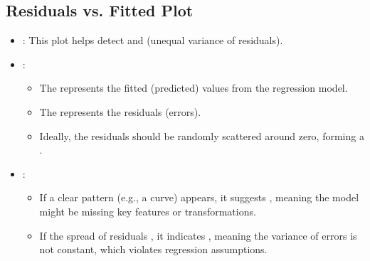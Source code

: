 \documentclass[letterpaper,10pt,english]{jupyterBook}
\begin{document}
\subsection{Residuals vs. Fitted Plot}
\label{\detokenize{02:residuals-vs-fitted-plot}}\begin{itemize}
\item {} 
\sphinxAtStartPar
{}: This plot helps detect  and  (unequal variance of residuals).

\item {} 
\sphinxAtStartPar
{}:
\begin{itemize}
\item {} 
\sphinxAtStartPar
The  represents the fitted (predicted) values from the regression model.

\item {} 
\sphinxAtStartPar
The  represents the residuals (errors).

\item {} 
\sphinxAtStartPar
Ideally, the residuals should be randomly scattered around zero, forming a .

\end{itemize}

\item {} 
\sphinxAtStartPar
{}:
\begin{itemize}
\item {} 
\sphinxAtStartPar
If a clear pattern (e.g., a curve) appears, it suggests , meaning the model might be missing key features or transformations.

\item {} 
\sphinxAtStartPar
If the spread of residuals , it indicates , meaning the variance of errors is not constant, which violates regression assumptions.

\end{itemize}

\end{itemize}
\end{document}
